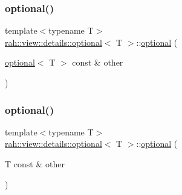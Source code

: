 \subsubsection{\texorpdfstring{optional()}{optional()}\hspace{0.1cm}{\footnotesize\ttfamily [2/3]}}
{\footnotesize\ttfamily template$<$typename T$>$ \\
\mbox{\hyperlink{structrah_1_1view_1_1details_1_1optional}{rah\+::view\+::details\+::optional}}$<$ T $>$\+::\mbox{\hyperlink{structrah_1_1view_1_1details_1_1optional}{optional}} (\begin{DoxyParamCaption}\item[{\mbox{\hyperlink{structrah_1_1view_1_1details_1_1optional}{optional}}$<$ T $>$ const \&}]{other }\end{DoxyParamCaption})\hspace{0.3cm}{\ttfamily [inline]}}

\mbox{\label{structrah_1_1view_1_1details_1_1optional_a67103a826656faabd3a8d12fea4a6b33}} 
\subsubsection{\texorpdfstring{optional()}{optional()}\hspace{0.1cm}{\footnotesize\ttfamily [3/3]}}
{\footnotesize\ttfamily template$<$typename T$>$ \\
\mbox{\hyperlink{structrah_1_1view_1_1details_1_1optional}{rah\+::view\+::details\+::optional}}$<$ T $>$\+::\mbox{\hyperlink{structrah_1_1view_1_1details_1_1optional}{optional}} (\begin{DoxyParamCaption}\item[{T const \&}]{other }\end{DoxyParamCaption})\hspace{0.3cm}{\ttfamily [inline]}}

\mbox{\label{structrah_1_1view_1_1details_1_1optional_ad6f6daea081b390c0348f2907aabcc0b}} 
